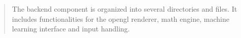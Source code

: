 






\begin{quote}
  The backend component is organized into several directories and files. It includes functionalities for the opengl renderer, math engine,
machine learning interface and input handling.
\end{quote}








